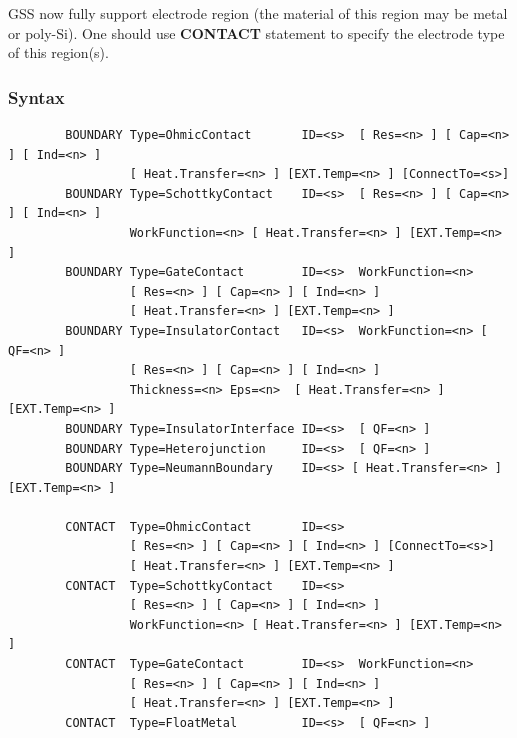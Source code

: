 \documentclass[11pt,pdftex]{article}
\begin{document}
GSS now fully support electrode region (the material of this region
may be metal or poly-Si). One should use \textbf{CONTACT} statement
to specify the electrode type of this region(s).

\subsubsection*{Syntax}
\begin{verbatim}
        BOUNDARY Type=OhmicContact       ID=<s>  [ Res=<n> ] [ Cap=<n> ] [ Ind=<n> ]
                 [ Heat.Transfer=<n> ] [EXT.Temp=<n> ] [ConnectTo=<s>]
        BOUNDARY Type=SchottkyContact    ID=<s>  [ Res=<n> ] [ Cap=<n> ] [ Ind=<n> ]
                 WorkFunction=<n> [ Heat.Transfer=<n> ] [EXT.Temp=<n> ]
        BOUNDARY Type=GateContact        ID=<s>  WorkFunction=<n>
                 [ Res=<n> ] [ Cap=<n> ] [ Ind=<n> ]
                 [ Heat.Transfer=<n> ] [EXT.Temp=<n> ]
        BOUNDARY Type=InsulatorContact   ID=<s>  WorkFunction=<n> [ QF=<n> ]
                 [ Res=<n> ] [ Cap=<n> ] [ Ind=<n> ]
                 Thickness=<n> Eps=<n>  [ Heat.Transfer=<n> ] [EXT.Temp=<n> ]
        BOUNDARY Type=InsulatorInterface ID=<s>  [ QF=<n> ]
        BOUNDARY Type=Heterojunction     ID=<s>  [ QF=<n> ]
        BOUNDARY Type=NeumannBoundary    ID=<s> [ Heat.Transfer=<n> ] [EXT.Temp=<n> ]

        CONTACT  Type=OhmicContact       ID=<s>
                 [ Res=<n> ] [ Cap=<n> ] [ Ind=<n> ] [ConnectTo=<s>]
                 [ Heat.Transfer=<n> ] [EXT.Temp=<n> ]
        CONTACT  Type=SchottkyContact    ID=<s>
                 [ Res=<n> ] [ Cap=<n> ] [ Ind=<n> ]
                 WorkFunction=<n> [ Heat.Transfer=<n> ] [EXT.Temp=<n> ]
        CONTACT  Type=GateContact        ID=<s>  WorkFunction=<n>
                 [ Res=<n> ] [ Cap=<n> ] [ Ind=<n> ]
                 [ Heat.Transfer=<n> ] [EXT.Temp=<n> ]
        CONTACT  Type=FloatMetal         ID=<s>  [ QF=<n> ]
\end{verbatim}
\end{document}

